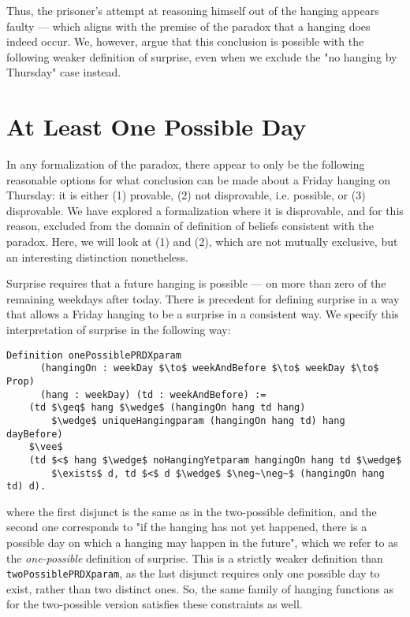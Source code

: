 \documentclass[runningheads]{llncs}
\begin{document}
Thus, the prisoner's attempt at reasoning himself out
of the hanging appears faulty --- which aligns with the premise of the
paradox that a hanging does indeed occur.
We, however, argue that this conclusion
is possible with the following weaker definition of surprise, even
when we exclude the "no hanging by Thursday" case instead.

\section{At Least One Possible Day}
\label{sec:one}

In any formalization of the paradox, there appear to only be the following reasonable
options for what conclusion
can be made about a Friday hanging on Thursday: it is either (1) provable,
(2) not disprovable, i.e. possible, or (3) disprovable.
We have explored a formalization where it is disprovable, and for this reason,
excluded from the domain of definition of beliefs consistent with the paradox.
Here, we will look at
(1) and (2), which are not mutually exclusive, but an interesting distinction nonetheless.

Surprise requires that a future hanging is possible --- on more than zero
of the remaining weekdays after today. There is precedent \cite{fourpossible}
for defining surprise
in a way that allows a Friday hanging to be a surprise in a consistent way.
We specify this interpretation of surprise in the following way:

\begin{lstlisting}[mathescape=true]
  Definition onePossiblePRDXparam
      (hangingOn : weekDay $\to$ weekAndBefore $\to$ weekDay $\to$ Prop)
      (hang : weekDay) (td : weekAndBefore) :=
    (td $\geq$ hang $\wedge$ (hangingOn hang td hang)
        $\wedge$ uniqueHangingparam (hangingOn hang td) hang dayBefore)
    $\vee$
    (td $<$ hang $\wedge$ noHangingYetparam hangingOn hang td $\wedge$
        $\exists$ d, td $<$ d $\wedge$ $\neg~\neg~$ (hangingOn hang td) d).
\end{lstlisting}

where the first disjunct is the same as in the two-possible definition, and
the second one corresponds to "if the hanging has not yet happened, there is a
possible day on which a hanging may happen in the future", which
  we refer to as the \emph{one-possible} definition of surprise. This is a strictly
weaker definition than {\tt twoPossiblePRDXparam}, as the last
disjunct requires only one possible day to exist, rather than two distinct ones.
So, the same family of hanging functions as for the two-possible version satisfies these
constraints as well.
\end{document}

